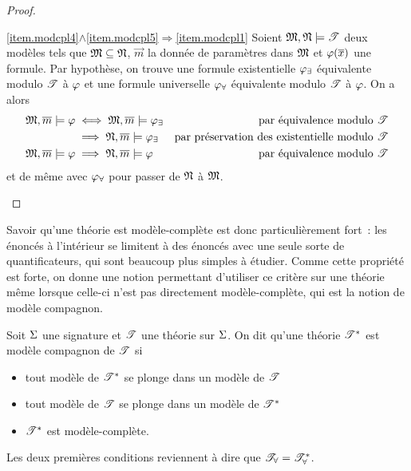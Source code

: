 \begin{proof}
\begin{itemize}
{    \ref{item.modcpl4}$\land$\ref{item.modcpl5}$\Rightarrow$\ref{item.modcpl1}}
    Soient $\mathfrak{M},\mathfrak{N}\models\mathscr T$ deux modèles tels que
    $\mathfrak{M}\subseteq\mathfrak{N}$, $\vec m$ la donnée de paramètres dans
    $\mathfrak{M}$ et $\varphi(\overline{x})$ une formule. Par hypothèse, on trouve une
    formule existentielle $\varphi_{\exists}$ équivalente modulo $\mathscr T$ à
    $\varphi$ et une formule universelle $\varphi_{\forall}$ équivalente
    modulo $\mathscr T$ à $\varphi$. On a alors
    \begin{align*}
      \mathfrak{M},\overline{m}\models\varphi &\iff \mathfrak{M},\overline{m}\models\varphi_{\exists}
      &\text{par équivalence modulo }\mathscr T\\
      &\implies \mathfrak{N},\overline{m}\models\varphi_{\exists}
      &\text{par préservation des existentielle modulo }\mathscr T\\
      \mathfrak{M},\overline{m}\models\varphi
      &\implies \mathfrak{N},\overline{m}\models\varphi &\text{par équivalence modulo }\mathscr T
    \end{align*}
    et de même avec $\varphi_{\forall}$ pour passer de $\mathfrak{N}$ à $\mathfrak{M}$.
    \qedhere
  \end{itemize}
\end{proof}

Savoir qu'une théorie est modèle-complète est donc particulièrement fort~: les
énoncés à l'intérieur se limitent à des énoncés avec une seule sorte de
quantificateurs, qui sont beaucoup plus simples à étudier. Comme cette propriété
est forte, on donne une notion permettant d'utiliser ce critère sur une théorie
même lorsque celle-ci n'est pas directement modèle-complète, qui est la notion
de modèle compagnon.

\begin{definition}
  Soit $\Sigma$ une signature et $\mathscr T$ une théorie sur $\Sigma$. On dit qu'une
  théorie $\mathscr T^*$ est modèle compagnon de $\mathscr T$ si
  \begin{itemize}
  \item tout modèle de $\mathscr T^*$ se plonge dans un modèle de $\mathscr T$
  \item tout modèle de $\mathscr T$ se plonge dans un modèle de $\mathscr T^*$
  \item $\mathscr T^*$ est modèle-complète.
  \end{itemize}
\end{definition}

\begin{remark}
  Les deux premières conditions reviennent à dire que
  $\mathscr T_\forall = \mathscr T^*_\forall$.
\end{remark}


